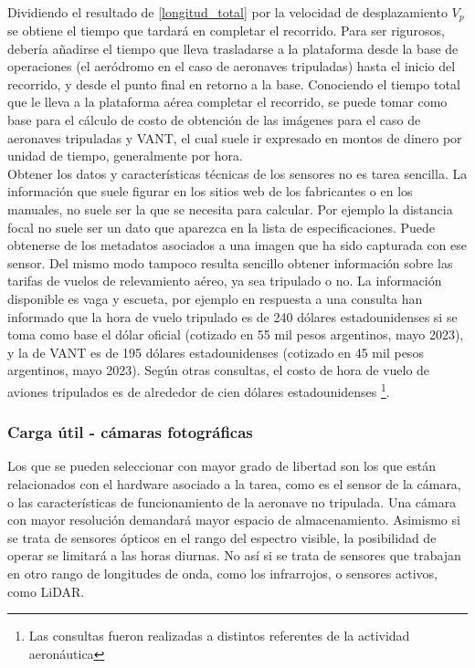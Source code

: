 \\
Dividiendo el resultado de \ref{longitud_total} por la velocidad de desplazamiento $V_p$ se obtiene el tiempo que tardará en completar el recorrido. Para ser rigurosos, debería añadirse el tiempo que lleva trasladarse a la plataforma desde la base de operaciones (el aeródromo en el caso de aeronaves tripuladas) hasta el inicio del recorrido, y desde el punto final en retorno a la base.
Conociendo el tiempo total que le lleva a la plataforma aérea completar el recorrido, se puede tomar como base para el cálculo de costo de obtención de las imágenes para el caso de aeronaves tripuladas y VANT, el cual suele ir expresado en montos de dinero por unidad de tiempo, generalmente por hora. \\
Obtener los datos y características técnicas de los sensores no es tarea sencilla. La información que suele figurar en los sitios web de los fabricantes o en los manuales, no suele ser la que se necesita para calcular. Por ejemplo la distancia focal no suele ser un dato que aparezca en la lista de especificaciones. Puede obtenerse de los metadatos asociados a una imagen que ha sido capturada con ese sensor.
Del mismo modo tampoco resulta sencillo obtener información sobre las tarifas de vuelos de relevamiento aéreo, ya sea tripulado o no. La información disponible es vaga y escueta, por ejemplo en respuesta a una consulta han informado que la hora de vuelo tripulado es de 240 dólares estadounidenses si se toma como base el dólar oficial (cotizado en 55 mil pesos argentinos, mayo 2023), y la de VANT es de 195 dólares estadounidenses (cotizado en 45 mil pesos argentinos, mayo 2023). Según otras consultas, el costo de hora de vuelo de aviones tripulados es de alrededor de cien dólares estadounidenses \footnote{Las consultas fueron realizadas a distintos referentes de la actividad aeronáutica}.
\subsubsection{Carga útil - cámaras fotográficas}
Los que se pueden seleccionar con mayor grado de libertad son los que están relacionados con el hardware asociado a la tarea, como es el sensor de la cámara, o las características de funcionamiento de la aeronave no tripulada. Una cámara con mayor resolución demandará mayor espacio de almacenamiento. Asimismo si se trata de sensores ópticos en el rango del espectro visible, la posibilidad de operar se limitará a las horas diurnas. No así si se trata de sensores que trabajan en otro rango de longitudes de onda, como los infrarrojos, o sensores activos, como LiDAR.
